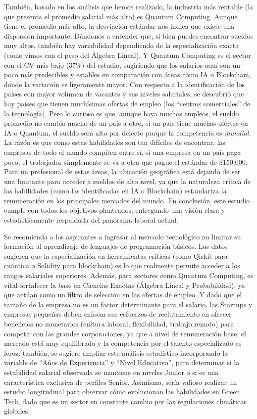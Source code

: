 \documentclass[oneside,11pt]{Latex/Classes/PhDthesisPSnPDF}
\begin{document}
También, basado en los análisis que hemos realizado, la industria más
rentable (la que presenta el promedio salarial más alto) es Quantum
Computing. Aunque tiene el promedio más alto, la desviación estándar nos
indica que existe una dispersión importante. Dándonos a entender que, si
bien puedes encontrar sueldos muy altos, también hay variabilidad
dependiendo de la especialización exacta (como vimos con el peso del
Álgebra Lineal). Y Quantum Computing es el sector con el CV más bajo
(37\%) del estudio, sugiriendo que los salarios aquí son un poco más
predecibles y estables en comparación con áreas como IA o Blockchain,
donde la variación es ligeramente mayor. Con respecto a la
identificación de los países con mayor volumen de vacantes y sus niveles
salariales, se descubrió que hay países que tienen muchísimas ofertas de
empleo (los ``centros comerciales'' de la tecnología). Pero lo curioso
es que, aunque haya muchos empleos, el sueldo promedio no cambia mucho
de un país a otro, si un país tiene muchas ofertas en IA o Quantum, el
sueldo será alto por defecto porque la competencia es \emph{mundial}. La
razón es que como estas habilidades son tan difíciles de encontrar, las
empresas de todo el mundo compiten entre sí, si una empresa en un país
paga poco, el trabajador simplemente se va a otra que pague el estándar
de \$150,000. Para un profesional de estas áreas, la ubicación
geográfica está dejando de ser una limitante para acceder a sueldos de
alto nivel, ya que la naturaleza crítica de las habilidades (como las
identificadas en IA o Blockchain) estandariza la remuneración en los
principales mercados del mundo. En conclusión, este estudio cumple con
todos los objetivos planteados, entregando una visión clara y
estadísticamente respaldada del panorama laboral actual.

Se recomienda a los aspirantes a ingresar al mercado tecnológico no
limitar su formación al aprendizaje de lenguajes de programación
básicos. Los datos sugieren que la especialización en herramientas
críticas (como Qiskit para cuántica o Solidity para blockchain) es lo
que realmente permite acceder a los rangos salariales superiores.
Además, para sectores como Quantum Computing, es vital fortalecer la
base en Ciencias Exactas (Álgebra Lineal y Probabilidad), ya que actúan
como un filtro de selección en las ofertas de empleo. Y dado que el
tamaño de la empresa no es un factor determinante para el salario, las
Startups y empresas pequeñas deben enfocar sus esfuerzos de
reclutamiento en ofrecer beneficios no monetarios (cultura laboral,
flexibilidad, trabajo remoto) para competir con las grandes
corporaciones, ya que a nivel de remuneración base, el mercado está muy
equilibrado y la competencia por el talento especializado es feroz.
también, se sugiere ampliar este análisis estadístico incorporando la
variable de ``Años de Experiencia'' y ``Nivel Educativo'', para
determinar si la estabilidad salarial observada se mantiene en niveles
Junior o si es una característica exclusiva de perfiles Senior.
Asimismo, sería valioso realizar un estudio longitudinal para observar
cómo evolucionan las habilidades en Green Tech, dado que es un sector en
constante cambio por las regulaciones climáticas globales.
\end{document}
